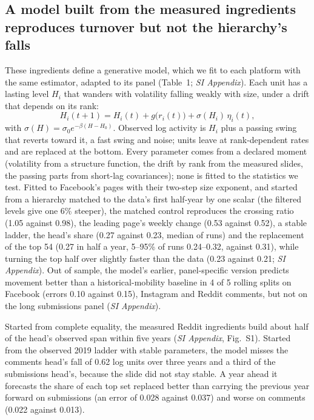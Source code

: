 \documentclass[9pt,twocolumn,twoside]{pnas-new}
\begin{document}
\subsection*{A model built from the measured ingredients reproduces turnover but not the hierarchy's falls}
These ingredients define a generative model, which we fit to each platform with the same estimator, adapted to its panel (Table~1; \textit{SI Appendix}). Each unit has a lasting level $H_i$ that wanders with volatility falling weakly with size, under a drift that depends on its rank:
\begin{equation}
H_i(t+1) = H_i(t) + g\big(r_i(t)\big) + \sigma(H_i)\,\eta_i(t),
\end{equation}
with $\sigma(H) = \sigma_0 e^{-\beta (H - H_0)}$. Observed log activity is $H_i$ plus a passing swing that reverts toward it, a fast swing and noise; units leave at rank-dependent rates and are replaced at the bottom. Every parameter comes from a declared moment (volatility from a structure function, the drift by rank from the measured slides, the passing parts from short-lag covariances); none is fitted to the statistics we test. Fitted to Facebook's pages with their two-step size exponent, and started from a hierarchy matched to the data's first half-year by one scalar (the filtered levels give one 6\% steeper), the matched control reproduces the crossing ratio (1.05 against 0.98), the leading page's weekly change (0.53 against 0.52), a stable ladder, the head's share (0.27 against 0.23, median of runs) and the replacement of the top 54 (0.27 in half a year, 5--95\% of runs 0.24--0.32, against 0.31), while turning the top half over slightly faster than the data (0.23 against 0.21; \textit{SI Appendix}). Out of sample, the model's earlier, panel-specific version predicts movement better than a historical-mobility baseline in 4 of 5 rolling splits on Facebook (errors 0.10 against 0.15), Instagram and Reddit comments, but not on the long submissions panel (\textit{SI Appendix}).

Started from complete equality, the measured Reddit ingredients build about half of the head's observed span within five years (\textit{SI Appendix}, Fig.~S1). Started from the observed 2019 ladder with stable parameters, the model misses the comments head's fall of 0.62 log units over three years and a third of the submissions head's, because the slide did not stay stable. A year ahead it forecasts the share of each top set replaced better than carrying the previous year forward on submissions (an error of 0.028 against 0.037) and worse on comments (0.022 against 0.013).
\end{document}
